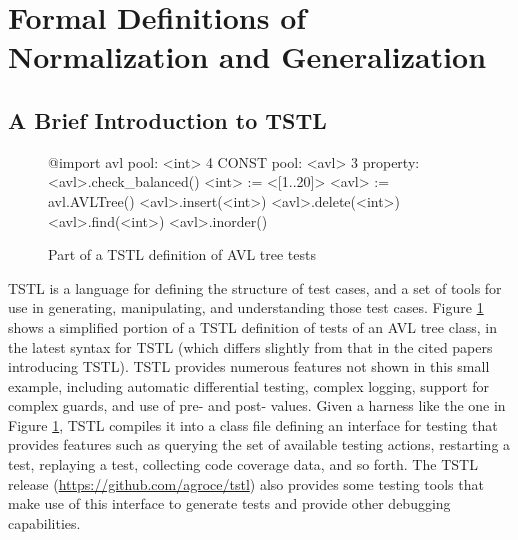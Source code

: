 \section{Formal Definitions of Normalization and Generalization}

\subsection{A Brief Introduction to TSTL}

\begin{figure}
{\scriptsize
\begin{code}
@import avl
\vspace{0.1in}
pool: <int> 4 CONST
pool: <avl> 3
\vspace{0.1in}
property: <avl>.check\_balanced()
\vspace{0.1in}
<int> := <[1..20]>
<avl> := avl.AVLTree()
\vspace{0.1in}
<avl>.insert(<int>)
<avl>.delete(<int>)
<avl>.find(<int>)
<avl>.inorder()
\end{code}
}
\caption{Part of a TSTL definition of AVL tree tests}
\label{fig:example}
\end{figure}


TSTL \cite{NFM15,ISSTA15} is a language for defining the structure of
test cases, and a set of tools for use in generating, manipulating,
and understanding those test cases.  Figure \ref{fig:example} shows a
simplified portion of a TSTL definition of tests of an AVL tree class,
in the latest syntax for TSTL (which differs slightly from that in the
cited papers introducing TSTL).  TSTL provides numerous features not
shown in this small example, including automatic differential testing,
complex logging, support for complex guards, and use of pre- and post-
values.  Given a harness like the one in Figure \ref{fig:example},
TSTL compiles it into a class file defining an interface for testing
that provides features such as querying the set of available testing
actions, restarting a test, replaying a test, collecting code coverage
data, and so forth.  The TSTL release
(\url{https://github.com/agroce/tstl}) also provides some testing
tools that make use of this interface to generate tests and provide
other debugging capabilities.

